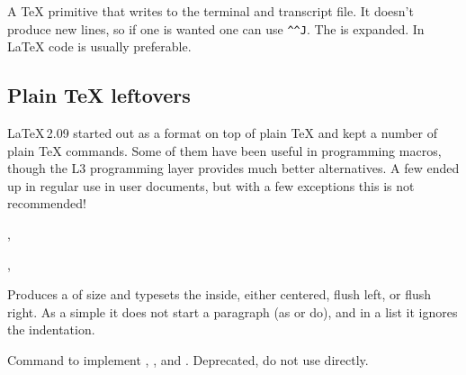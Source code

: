 \documentclass{l3in2edoc}
\begin{document}
\begin{function}[]
  {
    \message
  }
  \begin{syntax}
     
  \end{syntax}
  A \TeX{} primitive that writes  to the terminal and
  transcript file. It doesn't produce new lines, so if one is wanted
  one can use \texttt{\textasciicircum\textasciicircum J}. The
   is expanded. In \LaTeX{} code  is
  usually preferable.
\end{function}






\subsection{Plain \TeX{} leftovers}

\LaTeX\,2.09 started out as a format on top of plain \TeX{} and kept a
number of plain \TeX{} commands. Some of them have been useful in
programming \LaTeXe{} macros, though the L3 programming layer provides
much better alternatives.  A few ended up in regular use in user
documents, but with a few exceptions this is not recommended!


\begin{function}[user]
  {
    \centerline,
    \leftline,
    \rightline
  }
  \begin{syntax}
     
  \end{syntax}
  Produces a  of size  and typesets the
   inside, either centered, flush left, or flush
  right. As a simple  it does not start a paragraph (as
   or  do), and in a list it ignores the
  indentation.

\end{function}

\begin{function}
  {
    \@@line
  }
  \begin{syntax}
     
  \end{syntax}
  Command to implement , , and
  .  Deprecated, do not use directly.
\end{function}
\end{document}
